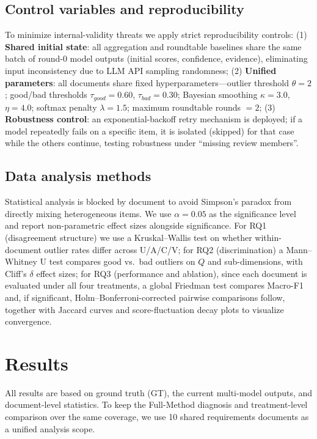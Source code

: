 \documentclass[sn-mathphys-num]{sn-jnl}
\begin{document}
\subsection{Control variables and reproducibility}
To minimize internal-validity threats we apply strict reproducibility controls: (1) \textbf{Shared initial state}: all aggregation and roundtable baselines share the same batch of round-0 model outputs (initial scores, confidence, evidence), eliminating input inconsistency due to LLM API sampling randomness; (2) \textbf{Unified parameters}: all documents share fixed hyperparameters---outlier threshold $\theta=2$; good/bad thresholds $\tau_{good}=0.60$, $\tau_{bad}=0.30$; Bayesian smoothing $\kappa=3.0$, $\eta=4.0$; softmax penalty $\lambda=1.5$; maximum roundtable rounds $=2$; (3) \textbf{Robustness control}: an exponential-backoff retry mechanism is deployed; if a model repeatedly fails on a specific item, it is isolated (skipped) for that case while the others continue, testing robustness under ``missing review members''.

\subsection{Data analysis methods}\label{sec:analysis}
Statistical analysis is blocked by document to avoid Simpson's paradox from directly mixing heterogeneous items. We use $\alpha=0.05$ as the significance level and report non-parametric effect sizes alongside significance. For RQ1 (disagreement structure) we use a Kruskal--Wallis test on whether within-document outlier rates differ across U/A/C/V; for RQ2 (discrimination) a Mann--Whitney U test compares good vs.\ bad outliers on $Q$ and sub-dimensions, with Cliff's $\delta$ effect sizes; for RQ3 (performance and ablation), since each document is evaluated under all four treatments, a global Friedman test compares Macro-F1 and, if significant, Holm--Bonferroni-corrected pairwise comparisons follow, together with Jaccard curves and score-fluctuation decay plots to visualize convergence.

\section{Results}\label{sec:results}
All results are based on ground truth (GT), the current multi-model outputs, and document-level statistics. To keep the Full-Method diagnosis and treatment-level comparison over the same coverage, we use 10 shared requirements documents as a unified analysis scope.
\end{document}

